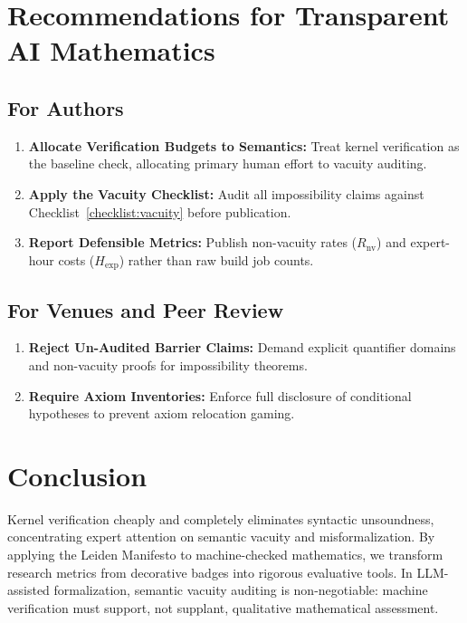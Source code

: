 \documentclass[11pt,a4paper]{article}
\theoremstyle{definition}
\theoremstyle{remark}
\begin{document}
\section{Recommendations for Transparent AI Mathematics}
\label{sec:recommendations}

\subsection{For Authors}
\begin{enumerate}[label=\textbf{\arabic*.}]
  \item \textbf{Allocate Verification Budgets to Semantics:} Treat kernel verification as the baseline check, allocating primary human effort to vacuity auditing.
  \item \textbf{Apply the Vacuity Checklist:} Audit all impossibility claims against Checklist~\ref{checklist:vacuity} before publication.
  \item \textbf{Report Defensible Metrics:} Publish non-vacuity rates ($R_{\text{nv}}$) and expert-hour costs ($H_{\text{exp}}$) rather than raw build job counts.
\end{enumerate}

\subsection{For Venues and Peer Review}
\begin{enumerate}[label=\textbf{\arabic*.}]
  \item \textbf{Reject Un-Audited Barrier Claims:} Demand explicit quantifier domains and non-vacuity proofs for impossibility theorems.
  \item \textbf{Require Axiom Inventories:} Enforce full disclosure of conditional hypotheses to prevent axiom relocation gaming.
\end{enumerate}

\section{Conclusion}
\label{sec:conclusion}

Kernel verification cheaply and completely eliminates syntactic unsoundness, concentrating expert attention on semantic vacuity and misformalization. By applying the Leiden Manifesto to machine-checked mathematics, we transform research metrics from decorative badges into rigorous evaluative tools. In LLM-assisted formalization, semantic vacuity auditing is non-negotiable: machine verification must support, not supplant, qualitative mathematical assessment.
\end{document}
